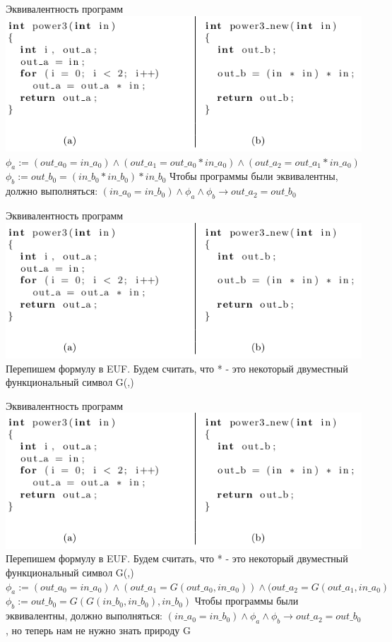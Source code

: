 \documentclass{beamer}
\begin{document}
\begin{frame}{Эквивалентность программ}
\includegraphics[scale=0.5]{power3.png}
$\phi_a := (out\_a_0 = in\_a_0) \wedge (out\_a_1 = out\_a_0 * in\_a_0) \wedge (out\_a_2 = out\_a_1 * in\_a_0)$\newline
$\phi_b := out\_b_0 = (in\_b_0 * in\_b_0) * in\_b_0$\newline
Чтобы программы были эквивалентны, должно выполняться:\newline
$(in\_a_0 = in\_b_0) \wedge \phi_a \wedge \phi_b \rightarrow out\_a_2 = out\_b_0$
\end{frame}

\begin{frame}{Эквивалентность программ}
\includegraphics[scale=0.5]{power3.png}
Перепишем формулу в EUF. Будем считать, что * - это некоторый двуместный функциональный символ G(,)
\end{frame}

\begin{frame}{Эквивалентность программ}
\includegraphics[scale=0.5]{power3.png}
Перепишем формулу в EUF. Будем считать, что * - это некоторый двуместный функциональный символ G(,)
$\phi_a := (out\_a_0 = in\_a_0) \wedge (out\_a_1 = G(out\_a_0, in\_a_0)) \wedge (out\_a_2 = G(out\_a_1, in\_a_0)$\newline
$\phi_b := out\_b_0 = G(G(in\_b_0, in\_b_0), in\_b_0)$\newline
Чтобы программы были эквивалентны, должно выполняться:\newline
$(in\_a_0 = in\_b_0) \wedge \phi_a \wedge \phi_b \rightarrow out\_a_2 = out\_b_0$, но теперь нам не нужно знать природу G
\end{frame}
\end{document}
